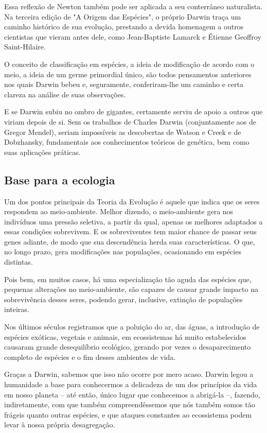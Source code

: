 \documentclass[12pt]{extarticle}
\begin{document}
Essa reflexão de Newton também pode ser aplicada a seu conterrâneo naturalista.
Na terceira edição de "A Origem das Espécies", o próprio Darwin traça um
caminho histórico de sua evolução, prestando a devida homenagem a outros
cientistas que vieram antes dele, como Jean-Baptiste Lamarck e Étienne Geoffroy
Saint-Hilaire.

O conceito de classificação em espécies, a ideia de modificação de acordo com
o meio, a ideia de um germe primordial único, são todos pensamentos anteriores
nos quais Darwin bebeu e, seguramente, conferiram-lhe um caminho e certa
clareza na análise de suas observações.

E se Darwin subiu no ombro de gigantes, certamente serviu de apoio a outros que
viriam depois de si. Sem os trabalhos de Charles Darwin (conjuntamente aos de
Gregor Mendel), seriam impossíveis as descobertas de Watson e Creek e de
Dobzhansky, fundamentais aos conhecimentos teóricos de genética, bem como suas
aplicações práticas.

\subsection{Base para a ecologia}

Um dos pontos principais da Teoria da Evolução é aquele que indica que os seres
respondem ao meio-ambiente. Melhor dizendo, o meio-ambiente gera nos indivíduos
uma pressão seletiva, a partir da qual, apenas os melhores adaptados a essas
condições sobrevivem. E os sobreviventes tem maior chance de passar seus genes
adiante, de modo que sua descendência herda suas características. O que, no
longo prazo, gera modificações nas populações, ocasionando em espécies
distintas.

Pois bem, em muitos casos, há uma especialização tão aguda das espécies que,
pequenas alterações no meio-ambiente, são capazes de causar grande impacto na
sobrevivência desses seres, podendo gerar, inclusive, extinção de populações
inteiras.

Nos últimos séculos registramos que a poluição do ar, das águas, a introdução
de espécies exóticas, vegetais e animais, em ecossistemas há muito
estabelecidos causaram grande desequilíbrio ecológico, gerando por vezes
o desaparecimento completo de espécies e o fim desses ambientes de vida.

Graças a Darwin, sabemos que isso não ocorre por mero acaso. Darwin legou
a humanidade a base para conhecermos a delicadeza de um dos princípios da vida
em nosso planeta -- até então, único lugar que conhecemos a abrigá-la --,
fazendo, indiretamente, com que também compreendêssemos que nós também somos
tão frágeis quanto outras espécies, e que ataques constantes ao ecossistema
podem levar à nossa própria desagregação.
\end{document}
